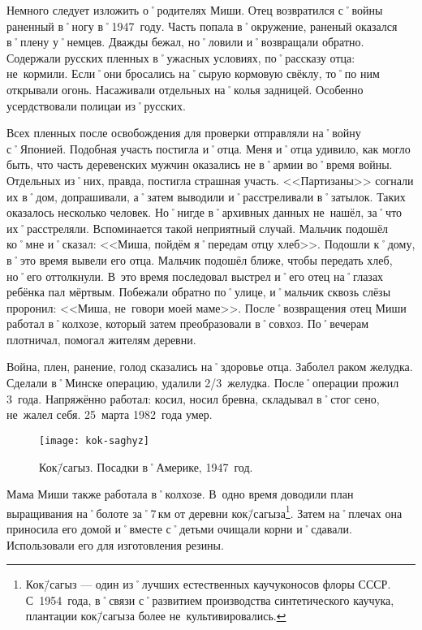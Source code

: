 Немного следует изложить о˚родителях Миши. Отец возвратился с˚войны раненный в˚ногу в˚1947~году. Часть попала в˚окружение, раненый оказался в˚плену у˚немцев. Дважды бежал, но˚ловили и˚возвращали обратно. Содержали русских пленных в˚ужасных условиях, по˚рассказу отца: не~кормили. Если˚они бросались на˚сырую кормовую свёклу, то˚по ним открывали огонь. Насаживали отдельных на˚колья задницей. Особенно усердствовали полицаи из˚русских. 

Всех пленных после освобождения для проверки отправляли на˚войну с˚Японией. Подобная участь постигла и˚отца. Меня и˚отца удивило, как могло быть, что часть деревенских мужчин оказались не в˚армии во˚время войны. Отдельных из˚них, правда, постигла страшная участь. <<Партизаны>> согнали их в˚дом, допрашивали, а˚затем выводили и˚расстреливали в˚затылок. Таких оказалось несколько человек. Но˚нигде в˚архивных данных не~нашёл, за˚что их˚расстреляли. Вспоминается такой неприятный случай. Мальчик подошёл ко˚мне и˚сказал: <<Миша, пойдём я˚передам отцу хлеб>>. Подошли к˚дому, в˚это время вывели его отца. Мальчик подошёл ближе, чтобы передать хлеб, но˚его оттолкнули. В~это время последовал выстрел и˚его отец на˚глазах ребёнка пал мёртвым. Побежали обратно по˚улице, и˚мальчик сквозь слёзы проронил: <<Миша, не~говори моей маме>>. 
После˚возвращения отец Миши работал в˚колхозе, который затем преобразовали в˚совхоз. По˚вечерам плотничал, помогал жителям деревни.

Война, плен, ранение, голод сказались на˚здоровье отца. Заболел раком желудка. Сделали в˚Минске операцию, удалили 2/3~желудка. После˚операции прожил 3~года. Напряжённо работал: косил, носил бревна, складывал в˚стог сено, не~жалел себя. 25~марта 1982~года умер.

\begin{wrapfigure}{O}{.4\textwidth}
\centering
\texttt{[image: kok-saghyz]}
\caption[Кок\=/сагыз. Посадки в˚Америке, 1947~год.]{Кок\=/сагыз. Посадки в˚Америке, 1947~год\footnotemark.}
\label{fig:kok-saghyz}
\end{wrapfigure}

Мама Миши также работала в˚колхозе. В~одно время доводили план выращивания на˚болоте за˚7\,км от деревни кок\=/сагыза\footnote{Кок\=/сагыз — один из˚лучших естественных каучуконосов флоры СССР. С~1954~года, в˚связи с˚развитием производства синтетического каучука, плантации кок\=/сагыза более не~культивировались.}. Затем на˚плечах она приносила его домой и˚вместе с˚детьми очищали корни и˚сдавали. Использовали его для изготовления резины.

